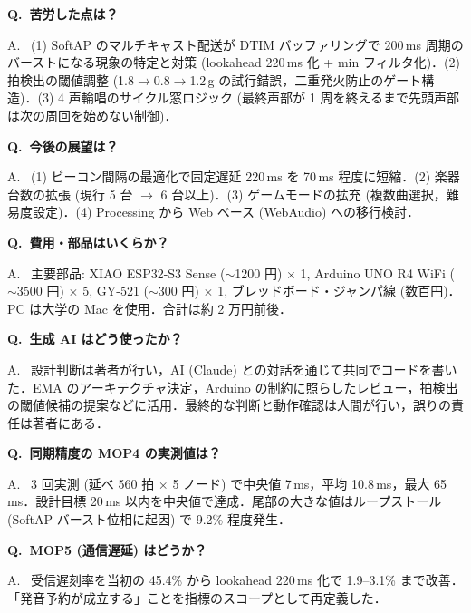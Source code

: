 \documentclass[uplatex,dvipdfmx,a4paper,10pt]{jsarticle}
\newcommand{\QA}[2]{%
  \par\noindent\textbf{\textcolor{qcolor}{Q.~#1}}%
  \par\noindent\textcolor{acolor}{A.~#2}\medskip%
}
\begin{document}
\QA{苦労した点は？}{
(1) SoftAP のマルチキャスト配送が DTIM バッファリングで 200\,ms 周期のバーストになる現象の特定と対策 (lookahead 220\,ms 化 + min フィルタ化)．(2) 拍検出の閾値調整 (1.8$\to$0.8$\to$1.2\,g の試行錯誤，二重発火防止のゲート構造)．(3) 4 声輪唱のサイクル窓ロジック (最終声部が 1 周を終えるまで先頭声部は次の周回を始めない制御)．}

\QA{今後の展望は？}{
(1) ビーコン間隔の最適化で固定遅延 220\,ms を 70\,ms 程度に短縮．(2) 楽器台数の拡張 (現行 5 台 $\to$ 6 台以上)．(3) ゲームモードの拡充 (複数曲選択，難易度設定)．(4) Processing から Web ベース (WebAudio) への移行検討．}

\QA{費用・部品はいくらか？}{
主要部品: XIAO ESP32-S3 Sense ($\sim$1200 円) $\times$ 1, Arduino UNO R4 WiFi ($\sim$3500 円) $\times$ 5, GY-521 ($\sim$300 円) $\times$ 1, ブレッドボード・ジャンパ線 (数百円)．PC は大学の Mac を使用．合計は約 2 万円前後．}

\QA{生成 AI はどう使ったか？}{
設計判断は著者が行い，AI (Claude) との対話を通じて共同でコードを書いた．EMA のアーキテクチャ決定，Arduino の制約に照らしたレビュー，拍検出の閾値候補の提案などに活用．最終的な判断と動作確認は人間が行い，誤りの責任は著者にある．}

\QA{同期精度の MOP4 の実測値は？}{
3 回実測 (延べ 560 拍 $\times$ 5 ノード) で中央値 7\,ms，平均 10.8\,ms，最大 65\,ms．設計目標 20\,ms 以内を中央値で達成．尾部の大きな値はループストール (SoftAP バースト位相に起因) で 9.2\% 程度発生．}

\QA{MOP5 (通信遅延) はどうか？}{
受信遅刻率を当初の 45.4\% から lookahead 220\,ms 化で 1.9--3.1\% まで改善．「発音予約が成立する」ことを指標のスコープとして再定義した．}
\end{document}
